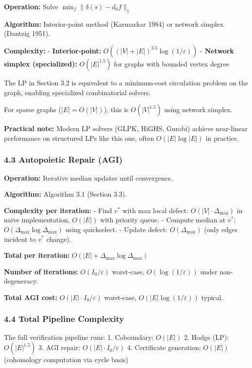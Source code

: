 \documentclass[
]{article}
\begin{document}
\textbf{Operation:} Solve \(\min_f \|\delta(s) - d_0 f\|_1\)

\textbf{Algorithm:} Interior-point method (Karmarkar 1984) or network
simplex (Dantzig 1951).

\textbf{Complexity:} - \textbf{Interior-point:}
\(O((|V| + |E|)^{3.5} \log(1/\varepsilon))\) - \textbf{Network simplex
(specialized):} \(O(|E|^{1.5})\) for graphs with bounded vertex degree

The LP in Section 3.2 is equivalent to a minimum-cost circulation
problem on the graph, enabling specialized combinatorial solvers.

For sparse graphs (\(|E| = O(|V|)\)), this is \(O(|V|^{1.5})\) using
network simplex.

\textbf{Practical note:} Modern LP solvers (GLPK, HiGHS, Gurobi) achieve
near-linear performance on structured LPs like this one, often
\(O(|E| \log |E|)\) in practice.

\subsubsection{4.3 Autopoietic Repair
(AGI)}\label{autopoietic-repair-agi}

\textbf{Operation:} Iterative median updates until convergence.

\textbf{Algorithm:} Algorithm 3.1 (Section 3.3).

\textbf{Complexity per iteration:} - Find \(v^*\) with max local defect:
\(O(|V| \cdot \Delta_{\max})\) in naive implementation, \(O(|E|)\) with
priority queue. - Compute median at \(v^*\):
\(O(\Delta_{\max} \log \Delta_{\max})\) using quickselect. - Update
defect: \(O(\Delta_{\max})\) (only edges incident to \(v^*\) change).

\textbf{Total per iteration:}
\(O(|E| + \Delta_{\max} \log \Delta_{\max})\)

\textbf{Number of iterations:} \(O(I_0 / \varepsilon)\) worst-case,
\(O(\log(1/\varepsilon))\) under non-degeneracy.

\textbf{Total AGI cost:} \(O(|E| \cdot I_0 / \varepsilon)\) worst-case,
\(O(|E| \log(1/\varepsilon))\) typical.

\subsubsection{4.4 Total Pipeline
Complexity}\label{total-pipeline-complexity}

The full verification pipeline runs: 1. Coboundary: \(O(|E|)\) 2. Hodge
(LP): \(O(|E|^{1.5})\) 3. AGI repair: \(O(|E| \cdot I_0 / \varepsilon)\)
4. Certificate generation: \(O(|E|)\) (cohomology computation via cycle
basis)
\end{document}
